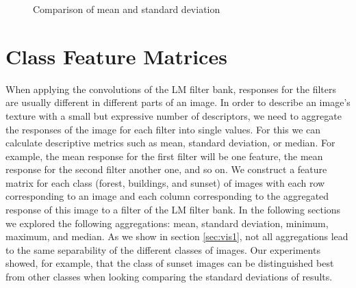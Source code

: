 \begin{figure}[!hbt]
\centering
{}
\caption{Comparison of mean and standard deviation}
\label{fig:means}
\end{figure}

\section{Class Feature Matrices}

When applying the convolutions of the LM filter bank, responses for the filters are usually different in different parts of an image. In order to describe an image's texture with a small but expressive number of descriptors, we need to aggregate the responses of the image for each filter into single values. For this we can calculate descriptive metrics such as mean, standard deviation, or median. For example, the mean response for the first filter will be one feature, the mean response for the second filter another one, and so on. We construct a feature matrix for each class (forest, buildings, and sunset) of images with each row corresponding to an image and each column corresponding to the aggregated response of this image to a filter of the LM filter bank. In the following sections we explored the following aggregations: mean, standard deviation, minimum, maximum, and median.
As we show in section \ref{sec:vis1}, not all aggregations lead to the same separability of the different classes of images. Our experiments showed, for example, that the class of sunset images can be distinguished best from other classes when looking comparing the standard deviations of results. 


